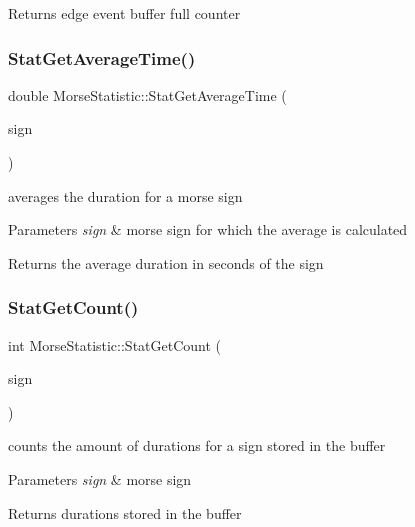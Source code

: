 \begin{DoxyReturn}{Returns}
edge event buffer full counter 
\end{DoxyReturn}
\mbox{\label{classMorseStatistic_a3347edf33028378ec2009a67c7f5b14d}} 
\subsubsection{\texorpdfstring{Stat\+Get\+Average\+Time()}{StatGetAverageTime()}}
{\footnotesize\ttfamily double Morse\+Statistic\+::\+Stat\+Get\+Average\+Time (\begin{DoxyParamCaption}\item[{Morse\+::\+Morse\+Sign}]{sign }\end{DoxyParamCaption})}



averages the duration for a morse sign 


\begin{DoxyParams}{Parameters}
{\em sign} & morse sign for which the average is calculated \\
\hline
\end{DoxyParams}
\begin{DoxyReturn}{Returns}
the average duration in seconds of the sign 
\end{DoxyReturn}
\mbox{\label{classMorseStatistic_a541c0f03283b2327051bb30e2241753a}} 
\subsubsection{\texorpdfstring{Stat\+Get\+Count()}{StatGetCount()}}
{\footnotesize\ttfamily int Morse\+Statistic\+::\+Stat\+Get\+Count (\begin{DoxyParamCaption}\item[{Morse\+::\+Morse\+Sign}]{sign }\end{DoxyParamCaption})}



counts the amount of durations for a sign stored in the buffer 


\begin{DoxyParams}{Parameters}
{\em sign} & morse sign \\
\hline
\end{DoxyParams}
\begin{DoxyReturn}{Returns}
durations stored in the buffer 
\end{DoxyReturn}
\mbox{\label{classMorseStatistic_af92781be60bdd00871dcb5907939dcb6}} 
